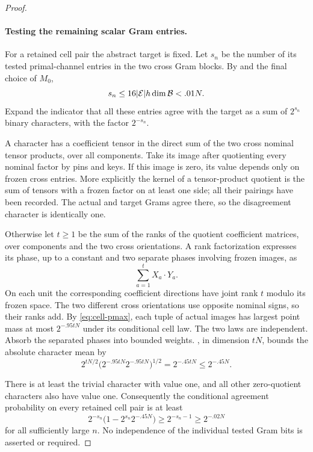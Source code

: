 \begin{proof}
\paragraph{Testing the remaining scalar Gram entries.}
For a retained cell pair the abstract target is fixed.  Let
$s_n$ be the number of its tested primal-channel entries in
the two cross Gram blocks.  By
 and the final choice of $M_0$,
\[
 s_n\le16|\mathcal E|h\dim\mathcal B<.01N.
\]
Expand the indicator that all these entries agree with the
target as a sum of $2^{s_n}$ binary characters, with the
factor $2^{-s_n}$.

A character has a coefficient tensor in the direct sum of
the two cross nominal tensor products, over all components.
Take its image after quotienting every nominal factor by
pins and keys.  If this image is zero, its value depends
only on frozen cross entries.  More explicitly the kernel
of a tensor-product quotient is the sum of tensors with a
frozen factor on at least one side; all their pairings have
been recorded.  The actual and target Grams agree there,
so the disagreement character is identically one.

Otherwise let $t\ge1$ be the sum of the ranks of the quotient
coefficient matrices, over components and the two cross
orientations.  A rank factorization expresses its phase,
up to a constant and two separate phases involving frozen
images, as
\[
 \sum_{a=1}^t X_a\cdot Y_a.
\]
On each unit the corresponding coefficient directions have
joint rank $t$ modulo its frozen space.  The two different
cross orientations use opposite nominal signs, so their
ranks add.  By \eqref{eq:cell-pmax}, each tuple of actual
images has largest point mass at most $2^{-.95tN}$ under
its conditional cell law.  The two laws are independent.
Absorb the separated phases into bounded weights.
, in dimension $tN$, bounds the absolute
character mean by
\begin{equation}\label{eq:gram-character-bound}
 2^{tN/2}\bigl(2^{-.95tN}2^{-.95tN}\bigr)^{1/2}
 =2^{-.45tN}\le2^{-.45N}.
\end{equation}

There is at least the trivial character with value one, and
all other zero-quotient characters also have value one.
Consequently the conditional agreement probability on every
retained cell pair is at least
\[
 2^{-s_n}\bigl(1-2^{s_n}2^{-.45N}\bigr)
 \ge2^{-s_n-1}\ge2^{-.02N}
\]
for all sufficiently large $n$.  No independence of the
individual tested Gram bits is asserted or required.


\end{proof}
